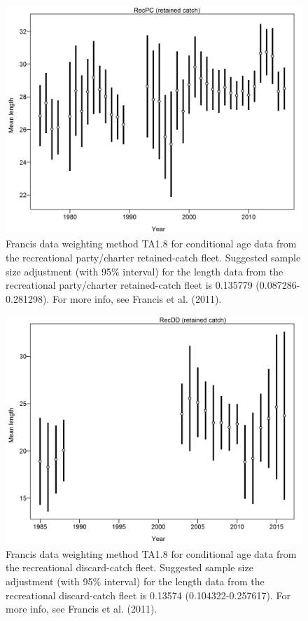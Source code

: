 \documentclass[12pt,]{article}
\begin{document}
\begin{figure}[htbp]
\centering
\includegraphics{r4ss/plots_mod1/comp_lendat_data_weighting_TA1.8_RecPC.png}
\caption{Francis data weighting method TA1.8 for conditional age data
from the recreational party/charter retained-catch fleet. Suggested
sample size adjustment (with 95\% interval) for the length data from the
recreational party/charter retained-catch fleet is 0.135779
(0.087286-0.281298). For more info, see Francis et al. (2011).
\label{fig:comp_lendat_data_weighting_TA1.8_RecPC}}
\end{figure}

\begin{figure}[htbp]
\centering
\includegraphics{r4ss/plots_mod1/comp_lendat_data_weighting_TA1.8_RecDD.png}
\caption{Francis data weighting method TA1.8 for conditional age data
from the recreational discard-catch fleet. Suggested sample size
adjustment (with 95\% interval) for the length data from the
recreational discard-catch fleet is 0.13574 (0.104322-0.257617). For
more info, see Francis et al. (2011).
\label{fig:comp_lendat_data_weighting_TA1.8_RecDD}}
\end{figure}
\end{document}
